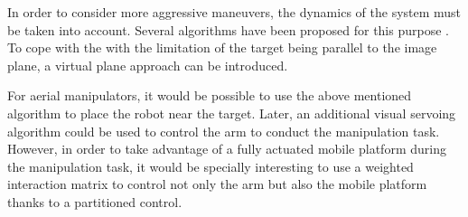 In order to consider more aggressive maneuvers, the dynamics of the system must be taken into account. Several algorithms have been proposed for this purpose \cite{ozawa_2011} \cite{jabbari_dynamic_2012} \cite{ceren_image_2012}. To cope with the with the limitation of the target being parallel to the image plane, a virtual plane approach \cite{zheng_image-based_2017} can be introduced.

For aerial manipulators, it would be possible to use the above mentioned algorithm to place the robot near the target. Later, an additional visual servoing algorithm could be used to control the arm to conduct the manipulation task. However, in order to take advantage of a fully actuated mobile platform during the manipulation task, it would be specially interesting to use a weighted interaction matrix \cite{santamaria-navarro_uncalibrated_2017} to control not only the arm but also the mobile platform thanks to a partitioned control.